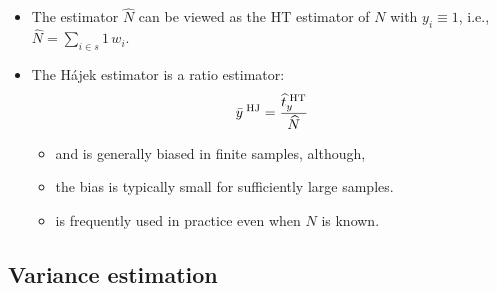 \documentclass{my_eth_beamer}
\numberwithin{equation}{section}
\begin{document}
\begin{frame}
    \begin{itemize}
    \setlength{\itemsep}{12pt}
        \item The estimator $\widehat{N}$ can be viewed as the HT estimator of
            $N$ with $y_i\equiv1$, i.e., $\widehat{N}=\sum_{i\in s}1\,w_i$.
        \item The \alert{H{\'a}jek estimator} is a \alert{ratio estimator}:
            \begin{equation*}
                \bar{y}^{\;\mathrm{HJ}} = \frac{\widehat{t}^{\;\mathrm{HT}}_y}{\widehat{N}}
            \end{equation*}
            \vspace{0.25em}
            \begin{itemize}
            \setlength{\itemsep}{12pt}
                \item[\goto] and is generally \alert{biased} in finite samples,
                    although,
                \item[\goto] the bias is typically small for sufficiently
                    \alert{large samples}.
                \item[\goto] is frequently used in practice even when $N$ is
                    \alert{known}.
            \end{itemize}
    \end{itemize}
\end{frame}

\subsection{Variance estimation}
\end{document}
